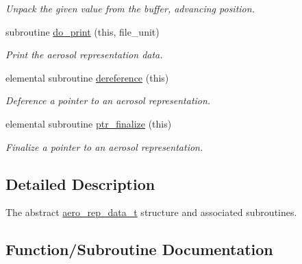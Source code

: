 \begin{DoxyCompactItemize}
\begin{DoxyCompactList}\small\item\em Unpack the given value from the buffer, advancing position. \end{DoxyCompactList}\item 
subroutine \mbox{\hyperlink{namespacepmc__aero__rep__data_a31a32f41ba259b6eef1636b933353001}{do\+\_\+print}} (this, file\+\_\+unit)
\begin{DoxyCompactList}\small\item\em Print the aerosol representation data. \end{DoxyCompactList}\item 
elemental subroutine \mbox{\hyperlink{namespacepmc__aero__rep__data_a2a93c7441f280e77157ef15b4e30574b}{dereference}} (this)
\begin{DoxyCompactList}\small\item\em Deference a pointer to an aerosol representation. \end{DoxyCompactList}\item 
elemental subroutine \mbox{\hyperlink{namespacepmc__aero__rep__data_a6a187513dbaf6fe2bee7870e43778020}{ptr\+\_\+finalize}} (this)
\begin{DoxyCompactList}\small\item\em Finalize a pointer to an aerosol representation. \end{DoxyCompactList}\end{DoxyCompactItemize}


\subsection{Detailed Description}
The abstract \mbox{\hyperlink{structpmc__aero__rep__data_1_1aero__rep__data__t}{aero\+\_\+rep\+\_\+data\+\_\+t}} structure and associated subroutines. 

\subsection{Function/\+Subroutine Documentation}
\mbox{\label{namespacepmc__aero__rep__data_a41ef8540357a012a2cddda626aab5bae}} 
